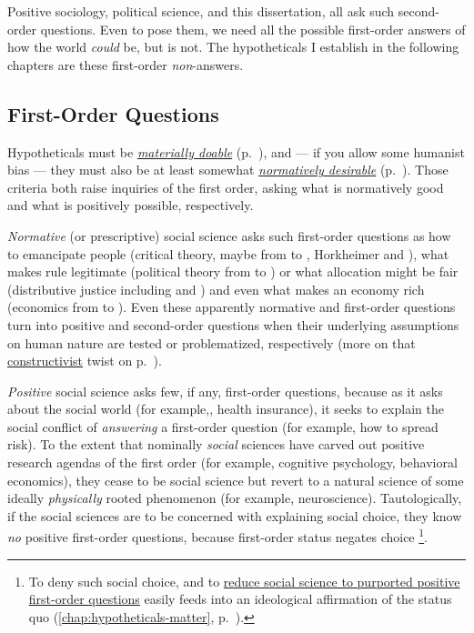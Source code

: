 Positive sociology, political science, and this dissertation, all ask such second-order questions. 
Even to pose them, we need all the possible first-order answers of how the world \emph{could} be, but is not. 
The hypotheticals I establish in the following chapters are these first-order \emph{non}-answers.

\subsection{First-Order Questions \label{sec:1st-questions}}
Hypotheticals must be \hyperref[sec:doable]{\emph{materially doable}} (p.~\pageref{sec:doable}), and --- if you allow some humanist bias --- they must also be at least somewhat \hyperref[sec:desirable]{\emph{normatively desirable}} (p.~\pageref{sec:desirable}). 
Those criteria both raise inquiries of the first order, asking what is normatively good and what is positively possible, respectively. 

\emph{Normative} (or prescriptive) social science asks such first-order questions as how to emancipate people (critical theory, maybe from \citeauthor{Gramsci1971}  to \citeauthor{Adorno-1974-aa}, Horkheimer and \citeauthor{Habermas-1984-aa}), what makes rule legitimate (political theory from \citeauthor{Aristoteles} to \citeauthor{Dahl-1989-aa}) or what allocation might be fair (distributive justice including \citeauthor{Friedman1962} and \citeauthor{Rawls1986}) and even what makes an economy rich (economics from \citeauthor{Smith-1776-lq} to \citeauthor{Hicks1939}). 
Even these apparently normative and first-order questions turn into positive and second-order questions when their underlying assumptions on human nature are tested or problematized, respectively (more on that \hyperref[itm:constructivism]{constructivist} twist on p.~\pageref{itm:constructivism}).

\emph{Positive} social science asks few, if any, first-order questions, because as it asks about the social world (for example,, health insurance), it seeks to explain the social conflict of \emph{answering} a first-order question (for example, how to spread risk). 
To the extent that nominally \emph{social} sciences have carved out positive research agendas of the first order (for example, cognitive psychology, behavioral economics), they cease to be social science but revert to a natural science of some ideally \emph{physically} rooted phenomenon (for example, neuroscience). 
Tautologically, if the social sciences are to be concerned with explaining social choice, they know \emph{no} positive first-order questions, because first-order status negates choice
\footnote{
	To deny such social choice, and to \hyperref[chap:hypotheticals-matter]{reduce social science to purported positive first-order questions} easily feeds into an ideological affirmation of the status quo (\autoref{chap:hypotheticals-matter}, p.~\pageref{chap:hypotheticals-matter}).%
}. 

